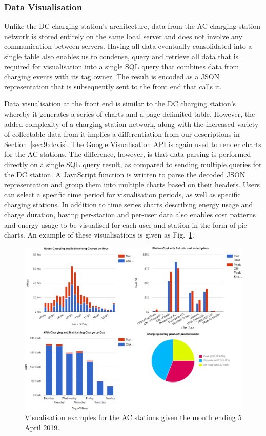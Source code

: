 \subsubsection{Data Visualisation}
Unlike the DC charging station’s architecture, data from the AC charging station network is stored entirely on the same local server and does not involve any communication between servers. Having all data eventually consolidated into a single table also enables us to condense, query and retrieve all data that is required for visualisation into a single SQL query that combines data from charging events with its tag owner. The result is encoded as a JSON representation that is subsequently sent to the front end that calls it.

Data visualisation at the front end is similar to the DC charging station’s whereby it generates a series of charts and a page delimited table. However, the added complexity of a charging station network, along with the increased variety of collectable data from it implies a differentiation from our descriptions in Section~\ref{sec:9:dcvis}. The Google Visualisation API is again used to render charts for the AC stations. The difference, however, is that data parsing is performed directly on a single SQL query result, as compared to sending multiple queries for the DC station. A JavaScript function is written to parse the decoded JSON representation and group them into multiple charts based on their headers. Users can select a specific time period for visualisation periods, as well as specific charging stations. In addition to time series charts describing energy usage and charge duration, having per-station and per-user data also enables cost patterns and energy usage to be visualised for each user and station in the form of pie charts. An example of these visualisations is given as Fig.~\ref{fig:9:acvis}.

\begin{figure}[H]
	\centering
	\includegraphics[width=\linewidth]{ac-vis-crop}
	\caption[Examples of visualisations for the AC station]{Visualisation examples for the AC stations given the month ending 5 April 2019.}
	\label{fig:9:acvis}
\end{figure}

